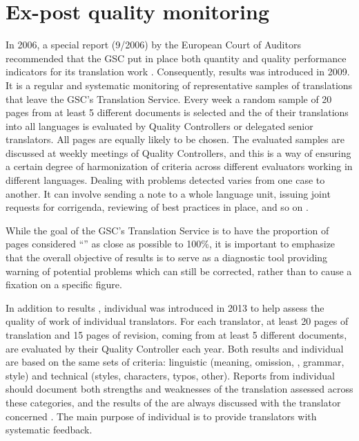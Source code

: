 \documentclass[output=paper]{langsci/langscibook}
\begin{document}
\section{Ex-post quality monitoring}\label{sec:hanzl:hanzl:5}

In 2006, a special report (9/2006) by the European Court of Auditors recommended that the GSC put in place both quantity and quality performance indicators for its translation work \citep{EuropeanCourt2006}. Consequently, results  was introduced in 2009. It is a regular and systematic monitoring of representative samples of translations that leave the GSC’s Translation Service. Every week a random sample of 20 pages from at least 5 different documents is selected and the  of their translations into all languages is evaluated by Quality Controllers or delegated senior translators. All pages are equally likely to be chosen. The evaluated samples are discussed at weekly meetings of Quality Controllers, and this is a way of ensuring a certain degree of harmonization of criteria across different evaluators working in different languages. Dealing with problems detected varies from one case to another. It can involve sending a  note to a whole language unit, issuing joint requests for corrigenda, reviewing of best practices in place, and so on \citep[72]{Council2015}.

\largerpage
While the goal of the GSC's Translation Service is to have the proportion of pages considered “” as close as possible to 100\%, it is important to emphasize that the overall objective of results  is to serve as a diagnostic tool providing warning of potential problems which can still be corrected, rather than to cause a fixation on a specific figure.

In addition to results , individual  was introduced in 2013 to help assess the quality of work of individual translators. For each translator, at least 20 pages of translation and 15 pages of revision, coming from at least 5 different documents, are evaluated by their Quality Controller each year. Both results  and individual  are based on the same sets of criteria: linguistic (meaning, omission, , grammar, style) and technical (styles, characters, typos, other). Reports from individual  should document both strengths and weaknesses of the translation assessed across these categories, and the results of the  are always discussed with the translator concerned \citep[72]{Council2015}. The main purpose of individual  is to provide translators with systematic feedback.
\end{document}
